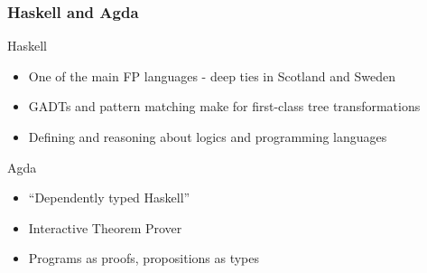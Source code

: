 \documentclass{beamer}
\begin{document}




\begin{frame}
\frametitle{Haskell and Agda}

\begin{exampleblock}{Haskell}
\begin{itemize}
\item One of the main FP languages - deep ties in Scotland and Sweden
\item GADTs and pattern matching make for first-class tree transformations
\item Defining and reasoning about logics and programming languages
\end{itemize}
\end{exampleblock}

\begin{exampleblock}{Agda}
\begin{itemize}
\item ``Dependently typed Haskell''
\item Interactive Theorem Prover
\item Programs as proofs, propositions as types
\end{itemize}

\end{exampleblock}
\end{frame}
\end{document}
